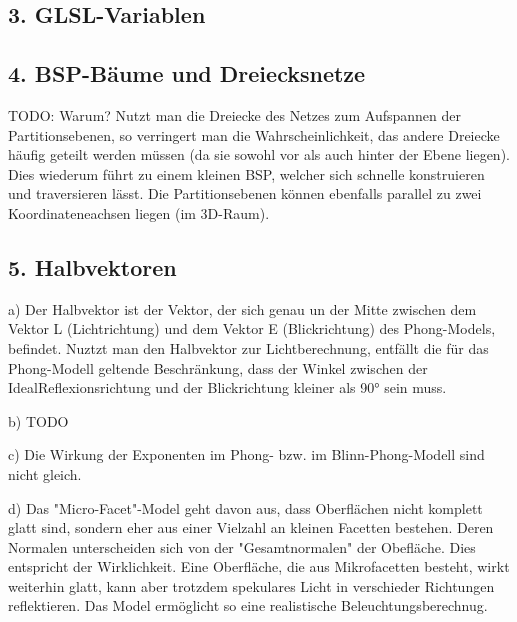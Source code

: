 \documentclass[a4paper,headings=small]{scrartcl}
\numberwithin{equation}{section} %
\numberwithin{figure}{section}   %
\begin{document}
\subsection*{3. GLSL-Variablen}

\subsection*{4. BSP-Bäume und Dreiecksnetze}
TODO: Warum?
Nutzt man die Dreiecke des Netzes zum Aufspannen der Partitionsebenen, so verringert man die Wahrscheinlichkeit, das andere Dreiecke häufig geteilt werden müssen (da sie sowohl vor als auch hinter der Ebene liegen). Dies wiederum führt zu einem kleinen BSP, welcher sich schnelle konstruieren und traversieren lässt.
Die Partitionsebenen können ebenfalls parallel zu zwei Koordinateneachsen liegen (im 3D-Raum).

\subsection*{5. Halbvektoren}
a) Der Halbvektor ist der Vektor, der sich genau un der Mitte zwischen dem Vektor L (Lichtrichtung) und dem Vektor E (Blickrichtung) des Phong-Models, befindet.
Nuztzt man den Halbvektor zur Lichtberechnung, entfällt die für das Phong-Modell geltende Beschränkung, dass der Winkel zwischen der IdealReflexionsrichtung und der Blickrichtung kleiner als 90° sein muss.

b) TODO

c) Die Wirkung der Exponenten im Phong- bzw. im Blinn-Phong-Modell sind nicht gleich.

d) Das "Micro-Facet"-Model geht davon aus, dass Oberflächen nicht komplett glatt sind, sondern eher aus einer Vielzahl an kleinen Facetten bestehen. Deren Normalen unterscheiden sich von der "Gesamtnormalen" der Obefläche. Dies entspricht der Wirklichkeit. Eine Oberfläche, die aus Mikrofacetten besteht, wirkt weiterhin glatt, kann aber trotzdem spekulares Licht in verschieder Richtungen reflektieren. Das Model ermöglicht so eine realistische Beleuchtungsberechnug.
\end{document}
